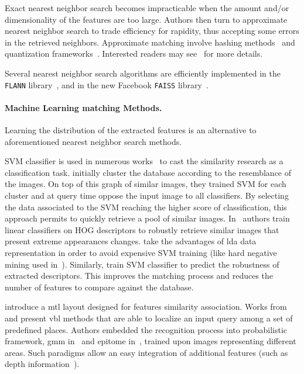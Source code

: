 Exact nearest neighbor search becomes impracticable when the amount and/or dimensionality of the features are too large. Authors then turn to approximate nearest neighbor search to trade efficiency for rapidity, thus accepting some errors in the retrieved neighbors. Approximate matching involve hashing methods~\citep{Gionis1999} and quantization frameworks~\citep{Nister2006,Philbin2007,Jegou2011}. Interested readers may see~\citep{Wang2017} for more details.

Several nearest neighbor search algorithms are efficiently implemented in the \texttt{FLANN} library~\citep{Muja2009}, and in the new Facebook \texttt{FAISS} library~\citep{Johnson2017}.

\paragraph{Machine Learning matching Methods.}
Learning the distribution of the extracted features is an alternative to aforementioned nearest neighbor search methods.

SVM classifier is used in numerous works~\citep{Shrivastava2011,Cao2013,McManus2014,Aubry2014} to cast the similarity research as a classification task. \citet{Cao2013} initially cluster the database according to the resemblance of the images. On top of this graph of similar images, they trained SVM for each cluster and at query time oppose the input image to all classifiers. By selecting the data associated to the SVM reaching the higher score of classification, this approach permits to quickly retrieve a pool of similar images. In~\citep{McManus2014,Aubry2014} authors train linear classifiers on HOG descriptors to robustly retrieve similar images that present extreme appearances changes. \citet{Aubry2014} take the advantages of \ac{lda} data representation in order to avoid expensive SVM training (like hard negative mining used in~\citep{Shrivastava2011,Kim2015}). Similarly, \citet{Kim2015} train SVM classifier to predict the robustness of extracted descriptors. This improves the matching process and reduces the number of features to compare against the database.

\citet{Lu2015} introduce a \ac{mtl} layout designed for features similarity association. Works from \citet{torralba2003context} and \citet{Ni2009} present \ac{vbl} methods that are able to localize an input query among a set of predefined places. Authors embedded the recognition process into probabilistic framework, \ac{gmm} in~\citep{torralba2003context} and epitome in~\citep{Ni2009}, trained upon images representing different areas. Such paradigms allow an easy integration of additional features (such as depth information~\citep{Ni2009}).


